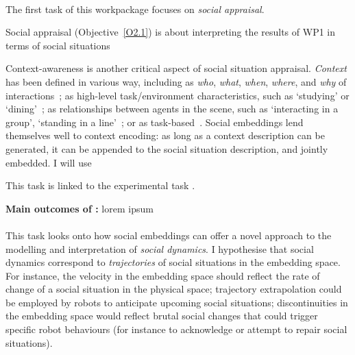 \paragraph{\TBA}

The first task of this workpackage focuses on \emph{social appraisal}.

Social appraisal (Objective~\ref{O2.1}) is about interpreting the results of WP1
in terms of social situations

Context-awareness is another critical aspect of social situation appraisal.
\emph{Context} has been defined in various way, including as \emph{who},
\emph{what}, \emph{when}, \emph{where}, and \emph{why} of
interactions~\cite{vinciarelli2009social}; as high-level task/environment
characteristics, such as `studying' or `dining'~\cite{nigam2015social}; as
relationships between agents in the scene, such as `interacting in a group',
`standing in a line'~\cite{althaus2004navigation}; or as
task-based~\cite{castellano2012detecting}. Social embeddings lend themselves
well to context encoding: as long as a context description can be generated, it
can be appended to the social situation description, and jointly embedded.
I will use 
%


This task is linked to the experimental task \TDB.


\begin{framed}
    {\noindent\bf Main outcomes of \tBA:} lorem ipsum 
\end{framed}

\paragraph{\TBB}

This task looks onto how social embeddings can offer a novel approach to the
modelling and interpretation of \emph{social dynamics}. I hypothesise that
social dynamics correspond to \emph{trajectories} of social situations in the
embedding space.  For instance, the velocity in the embedding space should
reflect the rate of change of a social situation in the physical space;
trajectory extrapolation could be employed by robots to anticipate upcoming
social situations; discontinuities in the embedding space would reflect brutal
social changes that could trigger specific robot behaviours (for instance to
acknowledge or attempt to repair social situations).  


